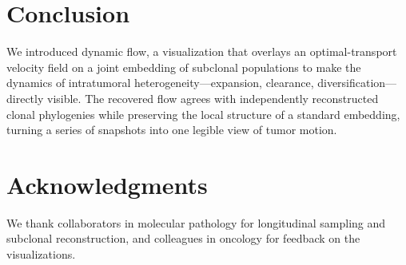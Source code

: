 \documentclass{article}
\begin{document}
\section{Conclusion}

We introduced dynamic flow, a visualization that overlays an optimal-transport velocity
field on a joint embedding of subclonal populations to make the dynamics of
intratumoral heterogeneity---expansion, clearance, diversification---directly visible.
The recovered flow agrees with independently reconstructed clonal phylogenies while
preserving the local structure of a standard embedding, turning a series of snapshots
into one legible view of tumor motion.

\section*{Acknowledgments}

We thank collaborators in molecular pathology for longitudinal sampling and subclonal
reconstruction, and colleagues in oncology for feedback on the visualizations.
\end{document}
